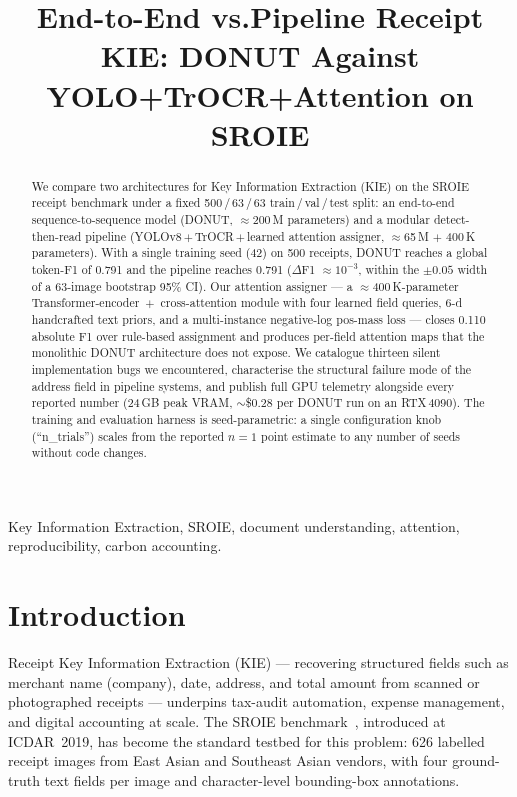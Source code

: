 \documentclass[conference]{IEEEtran}
\begin{document}
\title{End-to-End vs.\@ Pipeline Receipt KIE: DONUT
       Against YOLO+TrOCR+Attention on SROIE}

\author{
}

\maketitle

\begin{IEEEkeywords}
Key Information Extraction, SROIE, document understanding,
attention, reproducibility, carbon accounting.
\end{IEEEkeywords}

\begin{abstract}
We compare two architectures for Key Information Extraction (KIE) on
the SROIE receipt benchmark under a fixed 500\,/\,63\,/\,63
train\,/\,val\,/\,test split: an end-to-end sequence-to-sequence
model (DONUT, $\approx$200\,M parameters) and a modular
detect-then-read pipeline (YOLOv8\,$+$\,TrOCR\,$+$\,learned attention
assigner, $\approx$65\,M $+$ 400\,K parameters).
With a single training seed (42) on 500 receipts, DONUT reaches a
global token-F1 of 0.791 and the pipeline reaches 0.791
($\Delta$F1 $\approx 10^{-3}$, within the $\pm 0.05$ width of a
63-image bootstrap 95\% CI).  Our attention assigner --- a
$\approx$400\,K-parameter Transformer-encoder~$+$~cross-attention
module with four learned field queries, 6-d handcrafted text priors,
and a multi-instance negative-log pos-mass loss --- closes
0.110 absolute F1 over rule-based assignment and produces per-field
attention maps that the monolithic DONUT architecture does not
expose.  We catalogue thirteen silent implementation bugs we
encountered, characterise the structural failure mode of the address
field in pipeline systems, and publish full GPU telemetry alongside
every reported number (24\,GB peak VRAM, $\sim$\$0.28 per DONUT run
on an RTX\,4090).  The training and evaluation harness is
seed-parametric: a single configuration knob (``n\_trials'') scales
from the reported $n{=}1$ point estimate to any number of seeds
without code changes.
\end{abstract}

\section{Introduction}

Receipt Key Information Extraction (KIE) --- recovering structured
fields such as merchant name (company), date, address, and total amount
from scanned or photographed receipts --- underpins tax-audit
automation, expense management, and digital accounting at scale.
The SROIE benchmark~\cite{huang2019icdar}, introduced at ICDAR~2019,
has become the standard testbed for this problem: 626 labelled receipt
images from East Asian and Southeast Asian vendors, with four
ground-truth text fields per image and character-level bounding-box
annotations.
\end{document}
